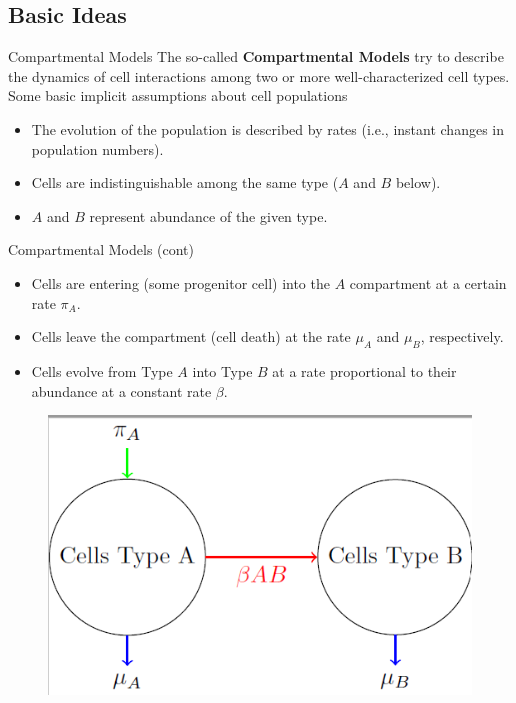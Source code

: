 \documentclass{beamer}
\begin{document}
\subsection{Basic Ideas}
\begin{frame}{Compartmental Models}
The so-called \textbf{Compartmental Models} try to describe the dynamics of cell interactions among two or more well-characterized cell types.
 Some basic implicit assumptions about cell populations
\begin{itemize}
	\item The evolution of the population is described by rates (i.e., instant changes in population numbers).
	\item Cells are indistinguishable among the same type ($A$ and $B$ below). 
	\item $A$ and $B$ represent abundance of the given type. 
\end{itemize}
\end{frame}
\begin{frame}{Compartmental Models (cont)}
	
\begin{itemize}
\item Cells are entering (some progenitor cell) into the $A$ compartment at a certain rate $\pi_A$.
\item Cells leave the compartment (cell death) at the rate $\mu_A$ and $\mu_B$, respectively.
\item Cells evolve from Type $A$ into Type $B$ at a rate proportional to their abundance at a constant rate $\beta$.
\end{itemize}	

	\begin{figure}[h]
	\centering
		\includegraphics[scale=0.4]{../Figures/fig_compartment.png}
\end{figure}
	
\end{frame}
\end{document}

